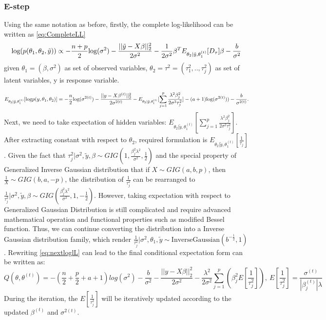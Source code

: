 \subsubsection{E-step}
Using the same notation as before, firstly, the complete log-likelihood can be written as \autoref{eq:CompleteLL}
\begin{equation}
	\label{eq:CompleteLL}
	\textnormal{log}(p(\theta_1,\theta_2,\tilde{y})) \propto -\frac{n+p}{2}\textnormal{log}(\sigma^2) - \frac{||\tilde{y}-X\beta||_2^2}{2\sigma^2} - \frac{1}{2\sigma^2}\beta^TE_{\theta_2|\tilde{y},\theta_1^{(t)}}[D_{\tau}]\beta - \frac{b}{\sigma^2}
\end{equation}
given $\theta_1 = (\beta,\sigma^2)$ as set of observed variables, $\theta_2 = \tau^2 = (\tau_1^2,..,\tau_j^2)$ as set of latent variables, y is response variable.


\begin{equation}
	\label{eq:nextloglL}
	E_{\theta_2|\tilde{y},\theta_1^{(t)}}[\textnormal{log}p(y,\theta_1,\theta_2)] = -\frac{n}{2} \textnormal{log}(\sigma^{2(t)}) - \frac{||y-X\beta^{(t)}||_2^2}{2\sigma^{2(t)}} - E_{\theta_2 |\tilde{y},\theta_1^{(t)}}[\sum_{j=1}^p \frac{\lambda^2\beta_j^2}{2\sigma^2\tau_j^2}] -(a+1)\textnormal{log}(\sigma^{2(t)})) - \frac{b}{\sigma^{2(t)}}.
\end{equation}
Next, we need to take expectation of hidden variables: $E_{\theta_2 |\tilde{y},\theta_1^{(t)}}[\sum_{j=1}^p \frac{\lambda^2\beta_j^2}{2\sigma^2\tau_j^2}]$. After extracting constant with respect to $\theta_2$, required formulation is $E_{\theta_2 |\tilde{y},\theta_1^{(t)}}[\frac{1}{\tau_j}]$. Given the fact that $\tau_j^2|\sigma^2,\tilde{y},\beta \sim GIG(1,\frac{\beta_j^2\lambda^2}{\sigma^2},\frac{1}{2})$ and the special property of Generalized Inverse Gaussian distribution that if $X \sim GIG(a,b,p)$, then $\frac{1}{X} \sim GIG(b,a,-p)$, the distribution of $\frac{1}{\tau_j^2}$ can be rearranged to  $\frac{1}{\tau_j^2}|\sigma^2,\tilde{y},\beta \sim GIG(\frac{\beta_j^2\lambda^2}{\sigma^2},1,-\frac{1}{2})$.
However, taking expectation with respect to Generalized Gaussian Distribution is still complicated and require advanced mathematical operation and functional properties such as modified Bessel function. Thus, we can continue converting the distribution into a Inverse Gaussian distribution family, which render $\frac{1}{\tau_j^2}|\sigma^2,\theta_1,\tilde{y} \sim \text{InverseGaussian}(b^{-\frac{1}{2}},1)$. Rewriting \autoref{eq:nextloglL} can lead to the final conditional expectation form can be written as:
\begin{equation}
	Q(\theta,\theta^{(t)}) = -(\frac{n}{2}+\frac{p}{2}+a+1)log(\sigma^2)-\frac{b}{\sigma^2}-\frac{||y-X\beta||_2^2}{2\sigma^2}-\frac{\lambda^2}{2\sigma^2}\sum_{j=1}^{p}(\beta_j^2 E[\frac{1}{\tau_j^2}]),\
	E[\frac{1}{\tau_j^2}] = \frac{\sigma^{(t)}}{|\beta_j^{(t)}|\lambda}
\end{equation}
During the iteration, the $E[\frac{1}{\tau_j^2}]$ will be iteratively updated according to the updated $\beta^{(t)}$ and $\sigma^{2(t)}$.
